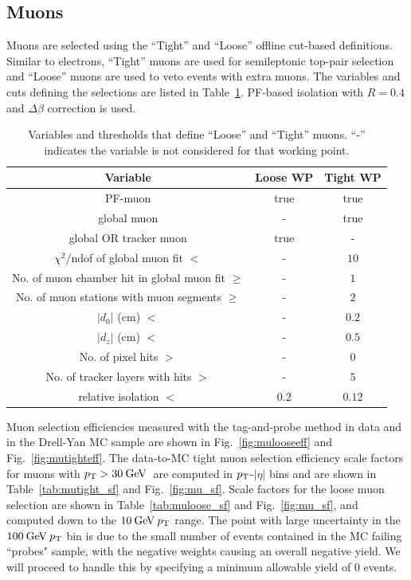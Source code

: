 \subsection{Muons}
\label{subsec:obj_muon}


Muons are selected using the ``Tight'' and ``Loose'' offline cut-based definitions. Similar to electrons, ``Tight'' muons are used for semileptonic top-pair selection and ``Loose'' muons are used to veto events with extra muons. The variables and cuts defining the selections are listed in Table~\ref{tab:tightmuon}. PF-based isolation with $R=0.4$ and $\Delta\beta$ correction is used.

\begin{table}[!ht]
\centering
\begin{tabular}{|c|c|c|}
\hline
  Variable                                          & Loose WP & Tight WP \\
\hline
  PF-muon                                           & true     & true   \\
  global muon                                       & -        & true   \\
  global OR tracker muon                            & true     & -      \\
  $\chi^2/$ndof of global muon fit $<$              & -        & $10$   \\
  No. of muon chamber hit in global muon fit $\geq$ & -        & $1$    \\
  No. of muon stations with muon segments $\geq$    & -        & $2$    \\
  $|d_0|$ (cm) $<$                                  & -        & $0.2$  \\
  $|d_z|$ (cm) $<$                                  & -        & $0.5$  \\
  No. of pixel hits $>$                             & -        & $0$    \\
  No. of tracker layers with hits $>$               & -        & $5$    \\
  relative isolation $<$                            & $0.2$    & $0.12$ \\
\hline
\end{tabular}
\caption{Variables and thresholds that define ``Loose'' and ``Tight'' muons. ``-'' indicates the variable is not considered for that working point.}
\label{tab:tightmuon}
\end{table}

Muon selection efficiencies measured with the tag-and-probe method in data and in the Drell-Yan MC sample are shown in Fig.~\ref{fig:mulooseeff} and Fig.~\ref{fig:mutighteff}. The data-to-MC tight muon selection efficiency scale factors for muons with $p_\mathrm{T}>30\:\mathrm{Ge\kern -0.1em V}\:$ are computed in $p_\mathrm{T}$-$|\eta|$ bins and are shown in Table~\ref{tab:mutight_sf} and Fig.~\ref{fig:mu_sf}. Scale factors for the loose muon selection are shown in Table~\ref{tab:muloose_sf} and Fig.~\ref{fig:mu_sf}, and computed down to the $10\:\mathrm{Ge\kern -0.1em V}\: p_\mathrm{T}$ range. The point with large uncertainty in the $100\:\mathrm{Ge\kern -0.1em V}\: p_\mathrm{T}$ bin is due to the small number of events contained in the MC failing ``probes" sample, with the negative weights causing an overall negative yield. We will proceed to handle this by specifying a minimum allowable yield of 0 events.


